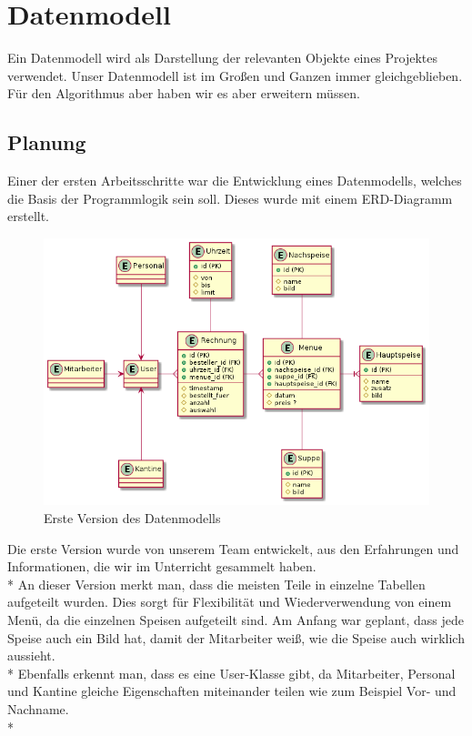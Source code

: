 \section{Datenmodell}
\author{David Ignjatovic}

Ein Datenmodell wird als Darstellung der relevanten Objekte eines Projektes verwendet. 
Unser Datenmodell ist im Großen und Ganzen immer gleichgeblieben. Für den Algorithmus aber haben wir es aber erweitern müssen.

\subsection{Planung}
\author{Benjamin Besic}
Einer der ersten Arbeitsschritte war die Entwicklung eines Datenmodells, welches die Basis der Programmlogik sein soll. Dieses wurde mit einem ERD-Diagramm erstellt.
\begin{figure}[htp]
    \centering
    \includegraphics[scale=0.4]{pics/erd-alt.png}
    \caption{Erste Version des Datenmodells}
    \label{fig:impl:ERDold}
\end{figure}

Die erste Version wurde von unserem Team entwickelt, aus den Erfahrungen und Informationen, die wir im Unterricht gesammelt haben. \\*
An dieser Version merkt man, dass die meisten Teile in einzelne Tabellen aufgeteilt wurden. Dies sorgt für Flexibilität und Wiederverwendung von einem Menü, da die einzelnen
Speisen aufgeteilt sind.
Am Anfang war geplant, dass jede Speise auch ein Bild hat, damit der Mitarbeiter weiß, wie die Speise auch wirklich aussieht.\\*
Ebenfalls erkennt man, dass es eine User-Klasse gibt, da Mitarbeiter, Personal und Kantine gleiche Eigenschaften miteinander teilen wie zum Beispiel Vor- und Nachname.\\*


